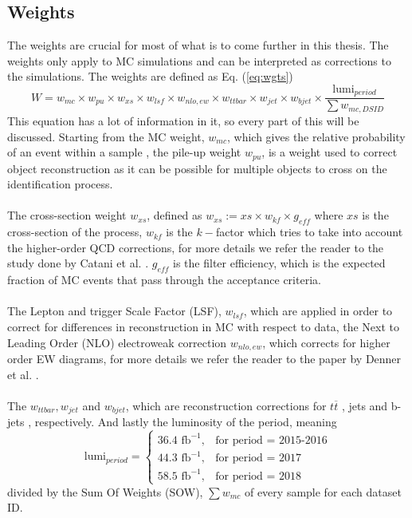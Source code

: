 \documentclass[12pt, a4paper]{book}
\begin{document}
\subsection{Weights}\label{sec:wgts}
The weights are crucial for most of what is to come further in this thesis. The weights only apply to MC simulations and can be interpreted as corrections to the simulations. The weights are defined as Eq. (\ref{eq:wgts})
\begin{equation}\label{eq:wgts}
   W = w_{mc}\times w_{pu}\times w_{xs}\times w_{lsf} \times w_{nlo,ew} \times w_{ttbar} \times w_{jet} \times w_{bjet} \times \frac{\text{lumi}_{period}}{\sum w_{mc, DSID}}
\end{equation}
This equation has a lot of information in it, so every part of this will be discussed. Starting from the MC weight, $w_{mc}$, which gives the relative probability of an event within a sample \cite{Pythia}, the pile-up weight $w_{pu}$, is a weight used to correct object reconstruction as it can be possible for multiple objects to cross on the 
identification process. \cite{Soyez:2018opl}\\ 
\\The cross-section weight $w_{xs}$, defined as $w_{xs} := xs \times w_{kf} \times g_{eff}$ where $xs$ is the cross-section of the process, $w_{kf}$ is the $k-$factor which tries to take into account the higher-order QCD corrections, 
for more details we refer the reader to the study done by Catani et al. \cite{Catani:2001cr}. $g_{eff}$ is the filter efficiency, which is the expected fraction of MC events that pass through the acceptance criteria.\\
\\The Lepton and trigger Scale Factor (LSF), $w_{lsf}$, which are applied in order to correct for differences in reconstruction in MC with respect to data, the Next to Leading Order (NLO) electroweak correction $w_{nlo,ew}$, which corrects for higher order EW diagrams, 
for more details we refer the reader to the paper by Denner et al. \cite{Denner:2022pwc}. \\
\\The $w_{ttbar}, w_{jet}$ and $w_{bjet}$, which are reconstruction corrections for $t\overline{t}$ \cite{Czakon:2015owf}, jets \cite{ATLAS:2014hvo} and b-jets \cite{ATLAS:2019bwq}, respectively. And lastly the luminosity of the period, meaning
$$
\text{lumi}_{period} = \begin{cases}
               36.4\text{ fb}^{-1},& \text{for period = 2015-2016}\\
               44.3\text{ fb}^{-1},& \text{for  period = 2017}\\
               58.5\text{ fb}^{-1},& \text{for  period = 2018}
               \end{cases}
$$
divided by the Sum Of Weights (SOW), $\sum w_{mc}$ of every sample for each dataset ID.
\end{document}
